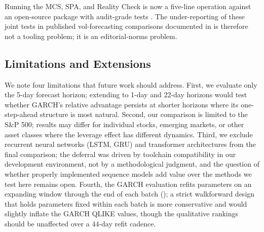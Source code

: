 Running the MCS, SPA, and Reality Check is now a five-line operation against an open-source package with audit-grade tests \citep{Khan2026VolEval}. The under-reporting of these joint tests in published vol-forecasting comparisons documented in \citet{Khan2026VolEval} is therefore not a tooling problem; it is an editorial-norms problem.

\subsection{Limitations and Extensions}

We note four limitations that future work should address. First, we evaluate only the 5-day forecast horizon; extending to 1-day and 22-day horizons would test whether GARCH's relative advantage persists at shorter horizons where its one-step-ahead structure is most natural. Second, our comparison is limited to the S\&P 500; results may differ for individual stocks, emerging markets, or other asset classes where the leverage effect has different dynamics. Third, we exclude recurrent neural networks (LSTM, GRU) and transformer architectures from the final comparison; the deferral was driven by toolchain compatibility in our development environment, not by a methodological judgment, and the question of whether properly implemented sequence models add value over the methods we test here remains open. Fourth, the GARCH evaluation refits parameters on an expanding window through the end of each batch (); a strict walkforward design that holds parameters fixed within each batch is more conservative and would slightly inflate the GARCH QLIKE values, though the qualitative rankings should be unaffected over a 44-day refit cadence.
